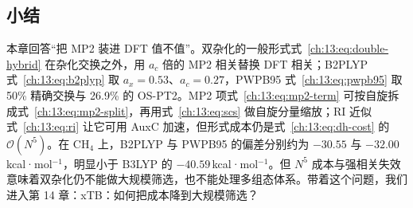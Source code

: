 \subsection*{小结}
本章回答“把 MP2 装进 DFT 值不值”。双杂化的一般形式式~\eqref{ch:13:eq:double-hybrid} 在杂化交换之外，用 $a_c$ 倍的 MP2 相关替换 DFT 相关；B2PLYP 式~\eqref{ch:13:eq:b2plyp} 取 $a_x=0.53$、$a_c=0.27$，PWPB95 式~\eqref{ch:13:eq:pwpb95} 取 50\% 精确交换与 26.9\% 的 OS-PT2。MP2 项式~\eqref{ch:13:eq:mp2-term} 可按自旋拆成式~\eqref{ch:13:eq:mp2-split}，再用式~\eqref{ch:13:eq:scs} 做自旋分量缩放；RI 近似式~\eqref{ch:13:eq:ri} 让它可用 AuxC 加速，但形式成本仍是式~\eqref{ch:13:eq:dh-cost} 的 $\mathcal{O}(N^5)$。在 CH$_4$ 上，B2PLYP 与 PWPB95 的偏差分别约为 $-30.55$ 与 $-32.00$\,kcal·mol$^{-1}$，明显小于 B3LYP 的 $-40.59$\,kcal·mol$^{-1}$。但 $N^5$ 成本与强相关失效意味着双杂化仍不能做大规模筛选，也不能处理多组态体系。带着这个问题，我们进入第 14 章：xTB：如何把成本降到大规模筛选？
